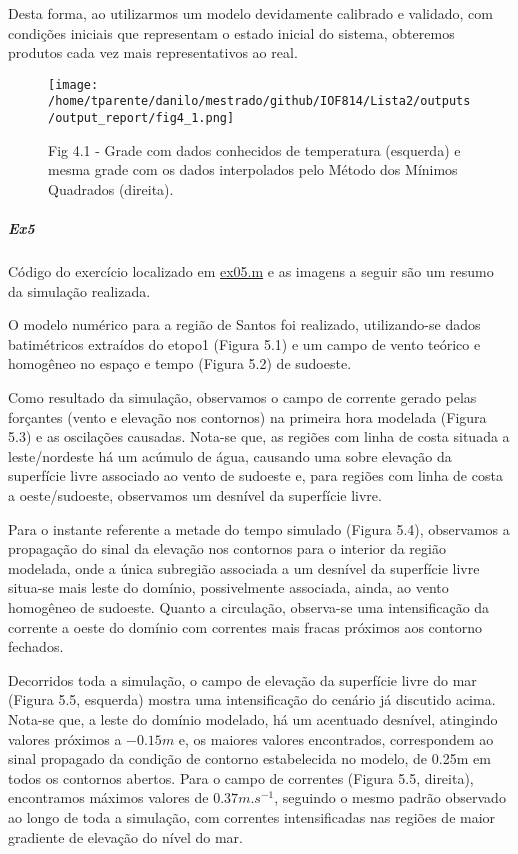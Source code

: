 \documentclass[11pt]{article}
\makeatletter
\def\maxwidth{\ifdim\Gin@nat@width>\linewidth\linewidth
    \else\Gin@nat@width\fi}
\let\Oldincludegraphics\includegraphics
\renewcommand{\includegraphics}[1]{\Oldincludegraphics[width=.8\maxwidth]{#1}}
\makeatother
\begin{document}
Desta forma, ao utilizarmos um modelo devidamente calibrado e validado,
com condições iniciais que representam o estado inicial do sistema,
obteremos produtos cada vez mais representativos ao real.

\begin{figure}
\centering
\centerline{\hbox{\texttt{[image: /home/tparente/danilo/mestrado/github/IOF814/Lista2/outputs/output\_report/fig4\_1.png]}}}
\caption{Fig 4.1 - Grade com dados conhecidos de temperatura (esquerda) e mesma grade com os
dados interpolados pelo Método dos Mínimos Quadrados (direita).}
\label{fig4:1}
\end{figure}

    \subparagraph{Ex5}\label{ex5}

Código do exercício localizado em \href{../codes/ex05.m}{ex05.m} e as
imagens a seguir são um resumo da simulação realizada.

O modelo numérico para a região de Santos foi realizado, utilizando-se
dados batimétricos extraídos do etopo1 (Figura 5.1) e um campo de vento
teórico e homogêneo no espaço e tempo (Figura 5.2) de sudoeste.

Como resultado da simulação, observamos o campo de corrente gerado pelas
forçantes (vento e elevação nos contornos) na primeira hora modelada
(Figura 5.3) e as oscilações causadas. Nota-se que, as regiões com linha
de costa situada a leste/nordeste há um acúmulo de água, causando uma
sobre elevação da superfície livre associado ao vento de sudoeste e,
para regiões com linha de costa a oeste/sudoeste, observamos um desnível
da superfície livre.

Para o instante referente a metade do tempo simulado (Figura 5.4),
observamos a propagação do sinal da elevação nos contornos para o
interior da região modelada, onde a única subregião associada a um
desnível da superfície livre situa-se mais leste do domínio,
possivelmente associada, ainda, ao vento homogêneo de sudoeste. Quanto a
circulação, observa-se uma intensificação da corrente a oeste do domínio
com correntes mais fracas próximos aos contorno fechados.

Decorridos toda a simulação, o campo de elevação da superfície livre do
mar (Figura 5.5, esquerda) mostra uma intensificação do cenário já
discutido acima. Nota-se que, a leste do domínio modelado, há um
acentuado desnível, atingindo valores próximos a \(-0.15m\) e, os
maiores valores encontrados, correspondem ao sinal propagado da condição
de contorno estabelecida no modelo, de 0.25m em todos os contornos
abertos. Para o campo de correntes (Figura 5.5, direita), encontramos
máximos valores de \(0.37 m.s^{-1}\), seguindo o mesmo padrão observado
ao longo de toda a simulação, com correntes intensificadas nas regiões
de maior gradiente de elevação do nível do mar.
\end{document}
